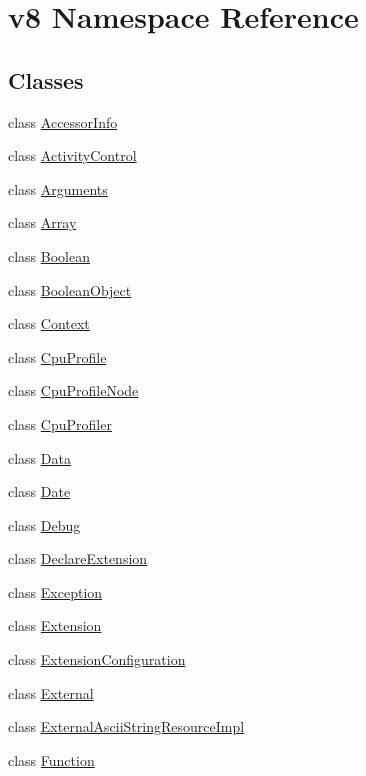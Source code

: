 \hypertarget{namespacev8}{}\section{v8 Namespace Reference}
\label{namespacev8}
\subsection*{Classes}
\begin{DoxyCompactItemize}
\item 
class \hyperlink{classv8_1_1_accessor_info}{Accessor\+Info}
\item 
class \hyperlink{classv8_1_1_activity_control}{Activity\+Control}
\item 
class \hyperlink{classv8_1_1_arguments}{Arguments}
\item 
class \hyperlink{classv8_1_1_array}{Array}
\item 
class \hyperlink{classv8_1_1_boolean}{Boolean}
\item 
class \hyperlink{classv8_1_1_boolean_object}{Boolean\+Object}
\item 
class \hyperlink{classv8_1_1_context}{Context}
\item 
class \hyperlink{classv8_1_1_cpu_profile}{Cpu\+Profile}
\item 
class \hyperlink{classv8_1_1_cpu_profile_node}{Cpu\+Profile\+Node}
\item 
class \hyperlink{classv8_1_1_cpu_profiler}{Cpu\+Profiler}
\item 
class \hyperlink{classv8_1_1_data}{Data}
\item 
class \hyperlink{classv8_1_1_date}{Date}
\item 
class \hyperlink{classv8_1_1_debug}{Debug}
\item 
class \hyperlink{classv8_1_1_declare_extension}{Declare\+Extension}
\item 
class \hyperlink{classv8_1_1_exception}{Exception}
\item 
class \hyperlink{classv8_1_1_extension}{Extension}
\item 
class \hyperlink{classv8_1_1_extension_configuration}{Extension\+Configuration}
\item 
class \hyperlink{classv8_1_1_external}{External}
\item 
class \hyperlink{classv8_1_1_external_ascii_string_resource_impl}{External\+Ascii\+String\+Resource\+Impl}
\item 
class \hyperlink{classv8_1_1_function}{Function}
\item 

\end{DoxyCompactItemize}
